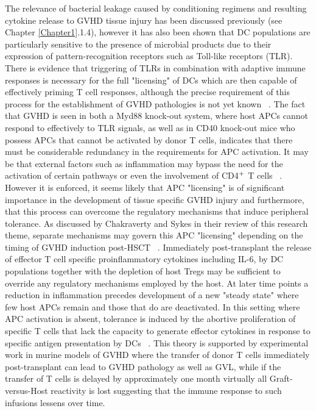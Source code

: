 The relevance of bacterial leakage caused by conditioning regimens and resulting cytokine release to GVHD tissue injury has been discussed previously (see Chapter \ref{Chapter1}.1.4), however it has also been shown that DC populations are particularly sensitive to the presence of microbial products due to their expression of pattern-recognition receptors such as Toll-like receptors (TLR). There is evidence that triggering of TLRs in combination with adaptive immune responses is necessary for the full "licensing" of DCs which are then capable of effectively priming T cell responses, although the precise requirement of this process for the establishment of GVHD pathologies is not yet known ~\autocite{Cha2007}. The fact that GVHD is seen in both a Myd88 knock-out system, where host APCs cannot respond to effectively to TLR signals, as well as in CD40 knock-out mice who possess APCs that cannot be activated by donor T cells, indicates that there must be considerable redundancy in the requirements for APC activation. It may be that external factors such as inflammation may bypass the need for the activation of certain pathways or even the involvement of CD4$\textsuperscript{+}$ T cells ~\autocite{Cha2007}. However it is enforced, it seems likely that APC "licensing" is of significant importance in the development of tissue specific GVHD injury and furthermore, that this process can overcome the regulatory mechanisms that induce peripheral tolerance. As discussed by Chakraverty and Sykes in their review of this research theme, separate mechanisms may govern this APC "licensing" depending on the timing of GVHD induction post-HSCT ~\autocite{Cha2007}. Immediately post-transplant the release of effector T cell specific proinflammatory cytokines including IL-6, by DC populations together with the depletion of host Tregs may be sufficient to override any regulatory mechanisms employed by the host. At later time points a reduction in inflammation precedes development of a new "steady state" where few host APCs remain and those that do are deactivated. In this setting where APC activation is absent, tolerance is induced by the abortive proliferation of specific T cells that lack the capacity to generate effector cytokines in response to specific antigen presentation by DCs ~\autocite{Cha2007}. This theory is supported by experimental work in murine models of GVHD where the transfer of donor T cells immediately post-transplant can lead to GVHD pathology as well as GVL, while if the transfer of T cells is delayed by approximately one month virtually all Graft-versus-Host reactivity is lost suggesting that the immune response to such infusions lessens over time. 

